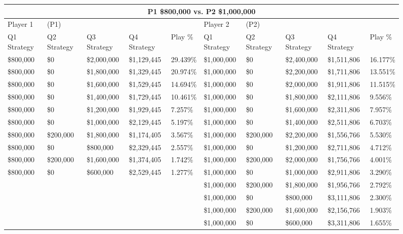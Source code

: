 \documentclass[11pt]{article}
\begin{document}
\begin{figure}
\tiny
\begin{tabular}{ |p{1.0cm}p{1.0cm}p{1.0cm}p{2.0cm}|p{1.0cm}||p{1.0cm}p{1.0cm}p{1.0cm}p{2.0cm}|p{1.0cm}|}
\hline
\multicolumn{10}{|c|}{P1 \$800,000 vs. P2 \$1,000,000} \\
\hline
Player 1 & (P1) & & & & Player 2 & (P2) & & & \\
\hline
Q1 Strategy & Q2 Strategy & Q3 Strategy & Q4 Strategy  &  Play \% & Q1 Strategy & Q2 Strategy & Q3 Strategy & Q4 Strategy  &  Play \%\\
\hline
\$800,000 & \$0 & \$2,000,000 & \$1,129,445 & 29.439\% & \$1,000,000 & \$0 & \$2,400,000 & \$1,511,806 & 16.177\% \\
\$800,000 & \$0 & \$1,800,000 & \$1,329,445 & 20.974\% & \$1,000,000 & \$0 & \$2,200,000 & \$1,711,806 & 13.551\% \\
\$800,000 & \$0 & \$1,600,000 & \$1,529,445 & 14.694\% & \$1,000,000 & \$0 & \$2,000,000 & \$1,911,806 & 11.515\% \\
\$800,000 & \$0 & \$1,400,000 & \$1,729,445 & 10.461\% & \$1,000,000 & \$0 & \$1,800,000 & \$2,111,806 & 9.556\% \\
\$800,000 & \$0 & \$1,200,000 & \$1,929,445 & 7.257\% & \$1,000,000 & \$0 & \$1,600,000 & \$2,311,806 & 7.957\% \\
\$800,000 & \$0 & \$1,000,000 & \$2,129,445 & 5.197\% & \$1,000,000 & \$0 & \$1,400,000 & \$2,511,806 & 6.703\% \\
\$800,000 & \$200,000 & \$1,800,000 & \$1,174,405 & 3.567\% & \$1,000,000 & \$200,000 & \$2,200,000 & \$1,556,766 & 5.530\% \\
\$800,000 & \$0 & \$800,000 & \$2,329,445 & 2.557\% & \$1,000,000 & \$0 & \$1,200,000 & \$2,711,806 & 4.712\% \\
\$800,000 & \$200,000 & \$1,600,000 & \$1,374,405 & 1.742\% & \$1,000,000 & \$200,000 & \$2,000,000 & \$1,756,766 & 4.001\% \\
\$800,000 & \$0 & \$600,000 & \$2,529,445 & 1.277\% & \$1,000,000 & \$0 & \$1,000,000 & \$2,911,806 & 3.290\% \\
&  &  &  &  & \$1,000,000 & \$200,000 & \$1,800,000 & \$1,956,766 & 2.792\% \\
&  &  &  &  & \$1,000,000 & \$0 & \$800,000 & \$3,111,806 & 2.300\% \\
&  &  &  &  & \$1,000,000 & \$200,000 & \$1,600,000 & \$2,156,766 & 1.903\% \\
&  &  &  &  & \$1,000,000 & \$0 & \$600,000 & \$3,311,806 & 1.655\% \\

\end{tabular}
\end{figure}
\end{document}
